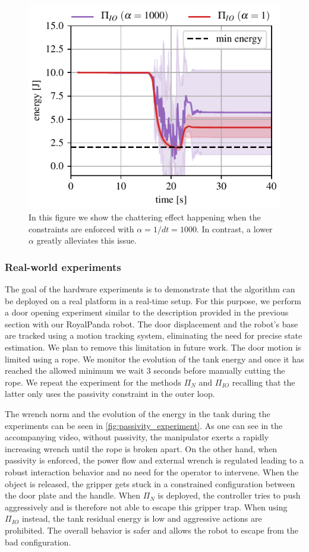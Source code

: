 \begin{figure}[t]
\centering
\includegraphics[width=0.8\columnwidth]{figures/fix_experiment/passivity_coefficient_comparison.pdf}
\caption{In this figure we show the chattering effect happening when the constraints are enforced with $\alpha = 1/dt = 1000$. In contrast, a lower $\alpha$ greatly alleviates this issue.}\label{fig:tank_as_zbf}
\end{figure}

\vspace{0.3cm}
\subsubsection{Real-world experiments}
The goal of the hardware experiments is to demonstrate that the algorithm can be deployed on a real platform in a real-time setup. For this purpose, we perform a door opening experiment similar to the description provided in the previous section with our RoyalPanda robot. The door displacement and the robot's base are tracked using a motion tracking system, eliminating the need for precise state estimation. We plan to remove this limitation in future work. The door motion is limited using a rope. We monitor the evolution of the tank energy and once it has reached the allowed minimum we wait 3 seconds before manually cutting the rope. We repeat the experiment for the methods $\Pi_{N}$ and $\Pi_{IO}$ recalling that the latter only uses the passivity constraint in the outer loop.

The wrench norm and the evolution of the energy in the tank during the experiments can be seen in \fig \ref{fig:passivity_experiment}. As one can see in the accompanying video, without passivity, the manipulator exerts a rapidly increasing wrench until the rope is broken apart. On the other hand, when passivity is enforced, the power flow and external wrench is regulated leading to a robust interaction behavior and no need for the operator to intervene. When the object is released, the gripper gets stuck in a constrained configuration between the door plate and the handle. When $\Pi_{N}$ is deployed, the controller tries to push aggressively and is therefore not able to escape this gripper trap. When using $\Pi_{IO}$ instead, the tank residual energy is low and aggressive actions are prohibited. The overall behavior is safer and allows the robot to escape from the bad configuration.  

